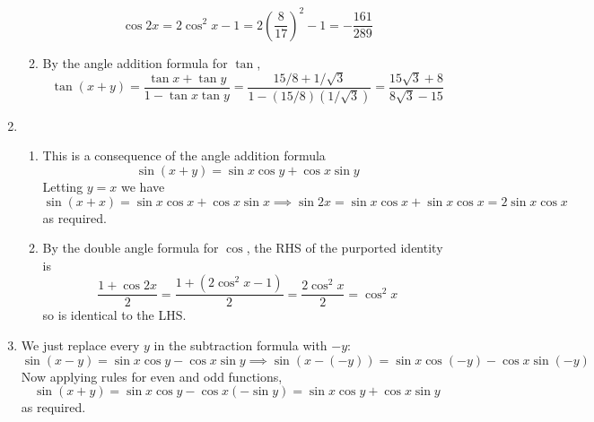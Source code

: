 \documentclass{article}
\newcommand{\ds}{\displaystyle}
\begin{document}
\begin{enumerate}
\begin{enumerate}
\begin{equation*}
      \cos 2x = 2\cos^2 x -1 = 2\left(\frac{8}{17}\right)^2 -1
      = -\frac{161}{289}
    \end{equation*}
  \item %
    By the angle addition formula for $\tan$,
    \begin{equation*}
      \tan(x+y) = \frac{\tan x + \tan y}{1-\tan x \tan y}
      = \frac{15/8+ 1/\sqrt{3}}{1-(15/8)(1/\sqrt{3})}
      = \frac{15\sqrt{3}+8}{8\sqrt{3}-15}
    \end{equation*}
  \end{enumerate}
\item %
  \begin{enumerate}
  \item %
    This is a consequence of the angle addition formula 
    \begin{equation*}
      \sin(x+y) = \sin x \cos y + \cos x \sin y
    \end{equation*}
    Letting $y=x$ we have
    \begin{equation*}
      \sin(x+x) = \sin x \cos x + \cos x \sin x
      \implies 
      \sin 2x = \sin x \cos x + \sin x \cos x = 2\sin x \cos x
    \end{equation*}
    as required.
  \item %
    By the double angle formula for $\cos$, the RHS of the purported
    identity is
    \begin{equation*}
      \frac{1+\cos 2x}{2} = \frac{1+(2\cos^2 x -1)}{2}
      = \frac{2\cos^2 x}{2} = \cos^2 x
    \end{equation*}
    so is identical to the LHS.
  \end{enumerate}
\item %
  We just replace every $y$ in the subtraction formula with $-y$:
  \begin{equation*}
    \sin(x-y)=\sin x \cos y - \cos x \sin y
    \implies
    \sin(x-(-y)) = \sin x \cos (-y) - \cos x \sin(-y)
  \end{equation*}
  Now applying rules for even and odd functions,
  \begin{equation*}
    \sin (x+y) = \sin x \cos y - \cos x (-\sin y) = \sin x \cos y +
    \cos x \sin y
  \end{equation*}
  as required.
\end{enumerate}
\end{document}
